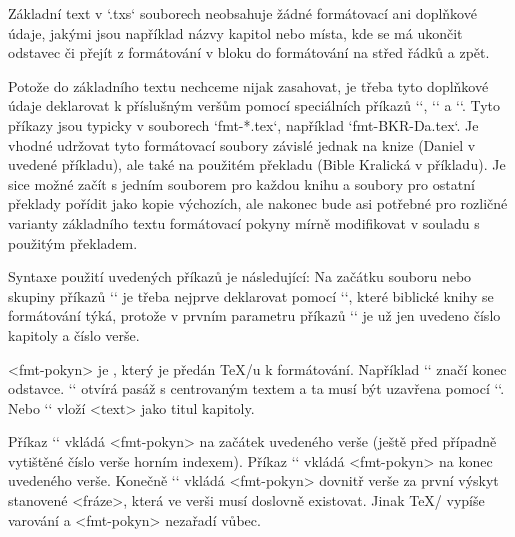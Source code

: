 Základní text v `.txs` souborech neobsahuje
žádné formátovací ani doplňkové údaje, jakými jsou například názvy kapitol
nebo místa, kde se má ukončit odstavec či přejít z formátování v bloku do
formátování na střed řádků a zpět.

\mnote{\code{\\fmtadd} \code{\\fmtpre} \code{\\fmtins}}
Potože do základního textu nechceme nijak zasahovat, je třeba tyto doplňkové
údaje deklarovat k příslušným veršům pomocí speciálních příkazů `\fmtadd`,
`\fmtpre` a `\fmtins`. Tyto příkazy jsou typicky v souborech `fmt-*.tex`,
například `fmt-BKR-Da.tex`. Je vhodné udržovat tyto formátovací soubory
závislé jednak na knize (Daniel v uvedené příkladu), ale také na použitém
překladu (Bible Kralická v příkladu). Je sice možné začít s jedním souborem
pro každou knihu a soubory pro ostatní překlady pořídit jako kopie výchozích,
ale nakonec bude asi potřebné pro rozličné varianty základního textu
formátovací pokyny mírně modifikovat v souladu s použitým překladem.

Syntaxe použití uvedených příkazů je následující:
\begtt
{}
\endtt
Na začátku souboru nebo skupiny
příkazů `\fmt*` je třeba nejprve deklarovat pomocí `\FormatedBook`, které
biblické knihy se formátování týká, protože v prvním parametru příkazů `\fmt*` je už
jen uvedeno číslo kapitoly a číslo verše. 

<fmt-pokyn> je , který je předán \TeX/u k formátování.
\mnote{\code{\\endgraf} \code{\\begcenter} \code{\\endcenter}}
Například `\endgraf` značí konec odstavce. `\begcenter` otvírá pasáž s
centrovaným textem a ta musí být uzavřena pomocí `\endcenter`. Nebo 
`` vloží <text> jako titul kapitoly.

\mnote{\code{\\fmtadd} \code{\\fmtpre} \code{\\fmtins}}
Příkaz `\fmtpre` vkládá <fmt-pokyn>
na začátek uvedeného verše (ještě před případně vytištěné číslo verše horním
indexem). Příkaz `\fmtadd` vkládá <fmt-pokyn> na konec uvedeného verše.
Konečně `\fmtins` vkládá <fmt-pokyn> dovnitř verše za první výskyt stanovené
<fráze>, která ve verši musí doslovně existovat. Jinak \TeX/ vypíše varování
a <fmt-pokyn> nezařadí vůbec.

